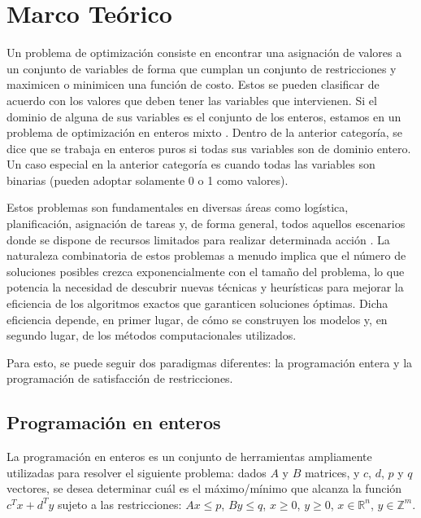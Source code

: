 \documentclass[12pt]{report}
\begin{document}
\chapter{Marco Teórico}

Un problema de optimización consiste en encontrar una asignación de valores a un conjunto de variables de forma que cumplan un conjunto de restricciones y maximicen o minimicen una función de costo. Estos se pueden clasificar de acuerdo con los valores que deben tener las variables que intervienen. Si el dominio de alguna de sus variables es el conjunto de los enteros, estamos en un problema de optimización en enteros mixto \cite{Hooker}. Dentro de la anterior categoría, se dice que se trabaja en enteros puros si todas sus variables son de dominio entero. Un caso especial en la anterior categoría es cuando todas las variables son binarias (pueden adoptar solamente 0 o 1 como valores).

Estos problemas son fundamentales en diversas áreas como logística, planificación, asignación de tareas y, de forma general, todos aquellos escenarios donde se dispone de recursos limitados para realizar determinada acción \cite{Hooker}. La naturaleza combinatoria de estos problemas a menudo implica que el número de soluciones posibles crezca exponencialmente con el tamaño del problema, lo que potencia la necesidad de descubrir nuevas técnicas y heurísticas para mejorar la eficiencia de los algoritmos exactos que garanticen soluciones óptimas. Dicha eficiencia depende, en primer lugar, de cómo se construyen los modelos y, en segundo lugar, de los métodos computacionales utilizados. 

Para esto, se puede seguir dos paradigmas diferentes: la programación entera y la programación de satisfacción de restricciones.

\section{Programación en enteros}

La programación en enteros es un conjunto de herramientas ampliamente utilizadas para resolver el siguiente problema: dados $A$ y $B$ matrices, y $c$, $d$, $p$ y $q$ vectores, se desea determinar cuál es el máximo/mínimo que alcanza la función $c^Tx+d^Ty$ sujeto a las restricciones: $Ax\leq p$, $By\leq q$, $x\geq 0$, $y\geq 0$, $x\in \mathbb{R} ^n$, $y\in \mathbb{Z}^m$. \cite{Hooker} 
\end{document}
